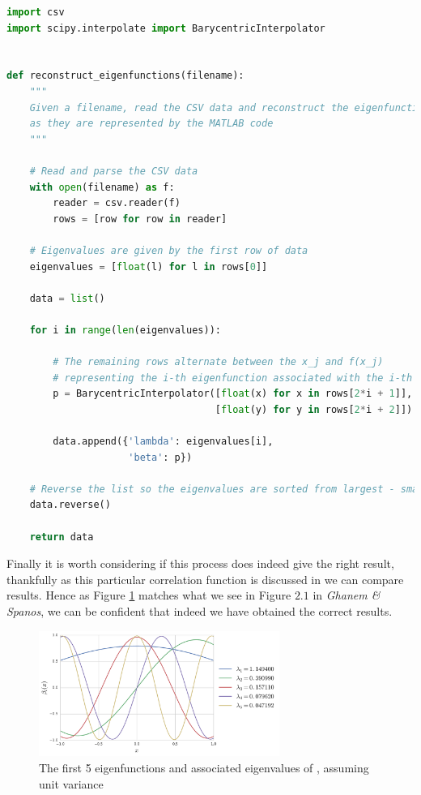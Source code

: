 \begin{lstlisting}[caption={Python code which reconstructs the eigenfunctions
                            we found using MATLAB},
                   label={code:python-reconstruct-eigen},
                   language=Python]
import csv
import scipy.interpolate import BarycentricInterpolator


def reconstruct_eigenfunctions(filename):
    """
    Given a filename, read the CSV data and reconstruct the eigenfunctions
    as they are represented by the MATLAB code
    """

    # Read and parse the CSV data
    with open(filename) as f:
        reader = csv.reader(f)
        rows = [row for row in reader]

    # Eigenvalues are given by the first row of data
    eigenvalues = [float(l) for l in rows[0]]

    data = list()

    for i in range(len(eigenvalues)):

        # The remaining rows alternate between the x_j and f(x_j)
        # representing the i-th eigenfunction associated with the i-th eigenvalue
        p = BarycentricInterpolator([float(x) for x in rows[2*i + 1]],
                                    [float(y) for y in rows[2*i + 2]])

        data.append({'lambda': eigenvalues[i],
                     'beta': p})

    # Reverse the list so the eigenvalues are sorted from largest - smallest
    data.reverse()

    return data
\end{lstlisting}

Finally it is worth considering if this process does indeed give the right
result, thankfully as this particular correlation function
 is discussed in
\cite{stochastic-fem} we can compare results. Hence as Figure
\ref{fig:kle-eigenfunctions} matches what we see in Figure $2.1$ in
\textit{Ghanem \& Spanos}, we can be confident that indeed we have obtained the
correct results.

\begin{figure}
    \centering
    \includegraphics[width=0.7\textwidth]{img/kle-eigenfunctions.pdf}
    \caption{The first 5 eigenfunctions and associated eigenvalues of
             , assuming unit
             variance}
    \label{fig:kle-eigenfunctions}
\end{figure}

